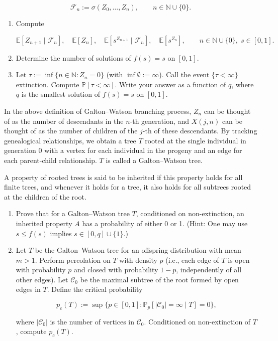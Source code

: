 \documentclass[11pt,a4paper]{article}
\newcommand{\examstatement}[1]{%
  \par\addvspace{0.85em}%
  \noindent{\bfseries #1}\par\nobreak\addvspace{0.28em}%
}
\begin{document}
\[
\mathcal{F}_n := \sigma(Z_0, \dots, Z_n), \qquad n \in \mathbb{N} \cup \{0\}.
\]

\begin{enumerate}[label=(\alph*)]
    \item Compute

    \[
    \mathbb{E}[Z_{n+1} \mid \mathcal{F}_n],\quad
    \mathbb{E}[Z_n],\quad
    \mathbb{E}[s^{Z_{n+1}} \mid \mathcal{F}_n],\quad
    \mathbb{E}[s^{Z_n}], \qquad n \in \mathbb{N} \cup \{0\},\; s \in [0, 1].
    \]
    \item Determine the number of solutions of \( f(s) = s \) on \( [0, 1] \).
    \item Let \( \tau := \inf\{n \in \mathbb{N} : Z_n = 0\} \) (with \( \inf \emptyset := \infty \)). Call the event \( \{\tau < \infty\} \) extinction. Compute \( \mathbb{P}[\tau < \infty] \). Write your answer as a function of \( q \), where \( q \) is the smallest solution of \( f(s) = s \) on \( [0, 1] \).
\end{enumerate}

\examstatement{Problem 6. [15 pts.]}
In the above definition of Galton--Watson branching process, \( Z_n \) can be thought of as the number of descendants in the \( n \)-th generation, and \( X(j, n) \) can be thought of as the number of children of the \( j \)-th of these descendants. By tracking genealogical relationships, we obtain a tree \( T \) rooted at the single individual in generation 0 with a vertex for each individual in the progeny and an edge for each parent-child relationship. \( T \) is called a Galton--Watson tree.

A property of rooted trees is said to be inherited if this property holds for all finite trees, and whenever it holds for a tree, it also holds for all subtrees rooted at the children of the root.
\begin{enumerate}[label=(\alph*)]
    \item Prove that for a Galton--Watson tree \( T \), conditioned on non-extinction, an inherited property \( A \) has a probability of either 0 or 1. (Hint: One may use \( s \le f(s) \) implies \( s \in [0, q] \cup \{1\} \).)
    \item Let \( T \) be the Galton--Watson tree for an offspring distribution with mean \( m > 1 \). Perform percolation on \( T \) with density \( p \) (i.e., each edge of \( T \) is open with probability \( p \) and closed with probability \( 1 - p \), independently of all other edges). Let \( \mathcal{C}_0 \) be the maximal subtree of the root formed by open edges in \( T \). Define the critical probability

    \[
    p_c(T) := \sup\{p \in [0, 1] : \mathbb{P}_p[|\mathcal{C}_0| = \infty \mid T] = 0\},
    \]

    where \( |\mathcal{C}_0| \) is the number of vertices in \( \mathcal{C}_0 \). Conditioned on non-extinction of \( T \), compute \( p_c(T) \).
\end{enumerate}
\end{document}
